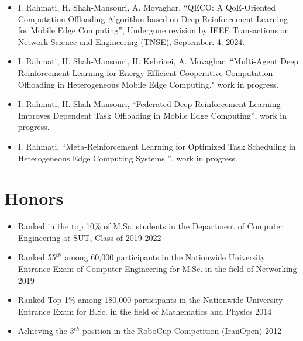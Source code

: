 \documentclass[11pt]{article}
\begin{document}
  \begin{itemize}
  	
  	\item I. Rahmati, H. Shah-Mansouri, A. Movaghar, ``QECO: A QoE-Oriented Computation Offloading Algorithm based on Deep Reinforcement Learning for Mobile Edge Computing'', Undergone revision by IEEE Transactions on Network Science and Engineering (TNSE), September. 4. 2024.
  	\href{https://arxiv.org/pdf/2311.02525}{\small  \faExternalLink}
  	\href{https://github.com/ImanRHT/QECO}{\faGithub}
  	
  	
  	\item I. Rahmati, H. Shah-Mansouri, H. Kebriaei, A. Movaghar, ``Multi-Agent Deep Reinforcement Learning for Energy-Efficient Cooperative Computation Offloading in Heterogeneous Mobile Edge Computing," work in progress. \href{https://imanrht.github.io/assets/Multi_AgentDRL.pdf}{\small  \faExternalLink} 
  	
  	\item I. Rahmati, H. Shah-Mansouri, ``Federated Deep Reinforcement Learning Improves Dependent Task Offloading in Mobile Edge Computing'', work in progress.  \href{https://imanrht.github.io/assets/FederatedDRL.pdf}{\small  \faExternalLink}
  	
  	\item I. Rahmati, ``Meta-Reinforcement Learning for Optimized Task Scheduling in Heterogeneous Edge Computing Systems
  	'', work in progress.  \href{https://imanrht.github.io/assets/MetaRL.pdf}{\small  \faExternalLink}
  	
  	


		

  \end{itemize}

\section{Honors}
\begin{itemize}
	\renewcommand\labelitemi{\ding{118}}
	\item{Ranked in the top 10\% of M.Sc. students in the Department of Computer Engineering at SUT, Class of 2019  \hfill  2022}\vspace{-2mm}
	\item {Ranked 55$^{th}$ among 60,000 participants in the Nationwide University Entrance Exam of Computer Engineering for M.Sc. in the field of Networking \hfill  2019}\vspace{-2mm}
	\item{Ranked Top 1\% among 180,000 participants in the Nationwide University Entrance Exam for B.Sc. in the field of Mathematics and Physics  \hfill  2014}\vspace{-2mm}
	\item{Achieving the 3$^{th}$ position in the RoboCup Competition (IranOpen)  \hfill  2012}\vspace{-2mm}
\end{itemize}
\end{document}
